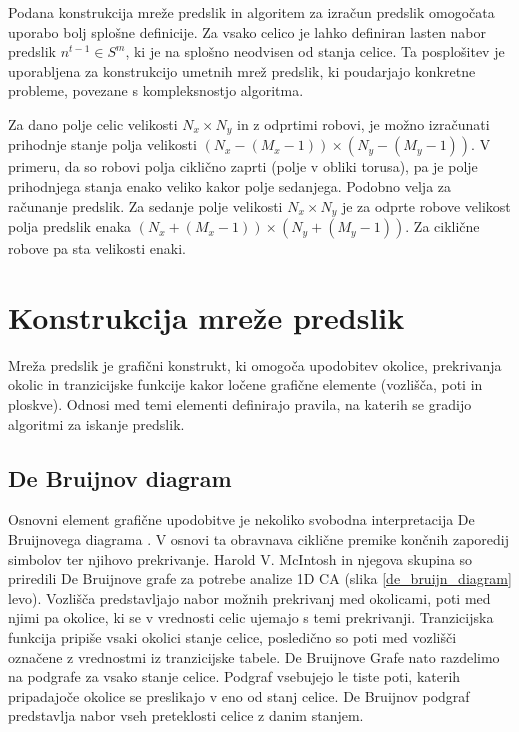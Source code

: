 \documentclass[12pt,a4paper,openany,twoside]{book}
\begin{document}
Podana konstrukcija mreže predslik in algoritem za izračun predslik omogočata uporabo
bolj splošne definicije. Za vsako celico je lahko definiran lasten nabor predslik \( n^{t-1} \in S^m \),
ki je na splošno neodvisen od stanja celice. Ta posplošitev je uporabljena za konstrukcijo umetnih
mrež predslik, ki poudarjajo konkretne probleme, povezane s kompleksnostjo algoritma.

Za dano polje celic velikosti \(N_x \times N_y\) in z odprtimi robovi,
je možno izračunati prihodnje stanje polja velikosti \((N_x-(M_x-1)) \times (N_y-(M_y-1))\).
V primeru, da so robovi polja ciklično zaprti (polje v obliki torusa),
pa je polje prihodnjega stanja enako veliko kakor polje sedanjega.
Podobno velja za računanje predslik. Za sedanje polje velikosti \(N_x \times N_y\)
je za odprte robove velikost polja predslik enaka \((N_x+(M_x-1)) \times (N_y+(M_y-1))\).
Za ciklične robove pa sta velikosti enaki.

\chapter{Konstrukcija mreže predslik}

Mreža predslik je grafični konstrukt, ki omogoča upodobitev
okolice, prekrivanja okolic in tranzicijske funkcije
kakor ločene grafične elemente (vozlišča, poti in ploskve).
Odnosi med temi elementi definirajo pravila,
na katerih se gradijo algoritmi za iskanje predslik.

\section{De Bruijnov diagram}

Osnovni element grafične upodobitve je nekoliko svobodna interpretacija De Bruijnovega diagrama \cite{WikiDeBruijn}.
V osnovi ta obravnava ciklične premike končnih zaporedij simbolov ter njihovo prekrivanje.
Harold V. McIntosh \cite{McIntosh1991} in njegova skupina \cite{Soto2008}
so priredili De Bruijnove grafe za potrebe analize 1D CA (slika \ref{de_bruijn_diagram} levo).
Vozlišča predstavljajo nabor možnih prekrivanj med okolicami,
poti med njimi pa okolice, ki se v vrednosti celic ujemajo s temi prekrivanji.
Tranzicijska funkcija pripiše vsaki okolici stanje celice,
posledično so poti med vozlišči označene z vrednostmi iz tranzicijske tabele.
De Bruijnove Grafe nato razdelimo na podgrafe za vsako stanje celice.
Podgraf vsebujejo le tiste poti, katerih pripadajoče okolice se preslikajo v eno od stanj celice.
De Bruijnov podgraf predstavlja nabor vseh preteklosti celice z danim stanjem.
\end{document}
